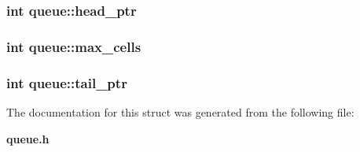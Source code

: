 \subsubsection{\setlength{\rightskip}{0pt plus 5cm}int \bf{queue::head\_\-ptr}}\label{structqueue_045d999cd2a517232a9fdbc4b33dc30b}


\subsubsection{\setlength{\rightskip}{0pt plus 5cm}int \bf{queue::max\_\-cells}}\label{structqueue_bc5f500b1a618dd362e39763c9887117}


\subsubsection{\setlength{\rightskip}{0pt plus 5cm}int \bf{queue::tail\_\-ptr}}\label{structqueue_f9862048c7261834d9d768ac128e3730}




The documentation for this struct was generated from the following file:\begin{CompactItemize}
\item 
\bf{queue.h}\end{CompactItemize}
